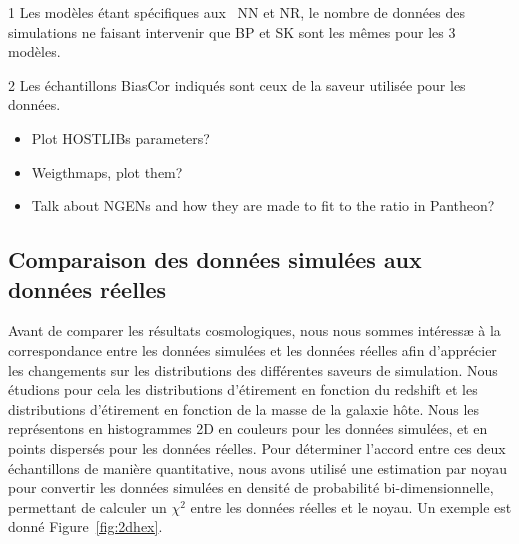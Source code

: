 \documentclass[../main/main.tex]{subfiles}
\begin{document}
\begin{table}
\begin{adjustbox}{max width=\textwidth}
\begin{threeparttable}
\begin{tabular}{cllcccccccccccccc}
            \end{tabular}
            \begin{tablenotes}[flushleft]
                \item [1] \small Les modèles étant spécifiques aux \hostlib\ NN
                    et NR, le nombre de données des simulations ne faisant
                    intervenir que BP et SK sont les mêmes pour les 3 modèles.
                \item [2] \small Les échantillons BiasCor indiqués sont ceux de
                    la saveur utilisée pour les données.
            \end{tablenotes}
        \end{threeparttable}
    \end{adjustbox}
\end{table}

\begin{itemize}
    \item Plot HOSTLIBs parameters?
    \item Weigthmaps, plot them?
    \item Talk about NGENs and how they are made to fit to the ratio in
        Pantheon?
\end{itemize}

\subsection{Comparaison des données simulées aux données réelles}\label{ssec:comp}

Avant de comparer les résultats cosmologiques, nous nous sommes intéressæ à la
correspondance entre les données simulées et les données réelles afin
d'apprécier les changements sur les distributions des différentes saveurs de
simulation. Nous étudions pour cela les distributions d'étirement en fonction du
redshift et les distributions d'étirement en fonction de la masse de la galaxie
hôte. Nous les représentons en histogrammes 2D en couleurs pour les données
simulées, et en points dispersés pour les données réelles. Pour déterminer
l'accord entre ces deux échantillons de manière quantitative, nous avons
utilisé une estimation par noyau pour convertir les données simulées en densité
de probabilité bi-dimensionnelle, permettant de calculer un $\chi^2$ entre les
données réelles et le noyau. Un exemple est donné Figure~\ref{fig:2dhex}.
\end{document}
